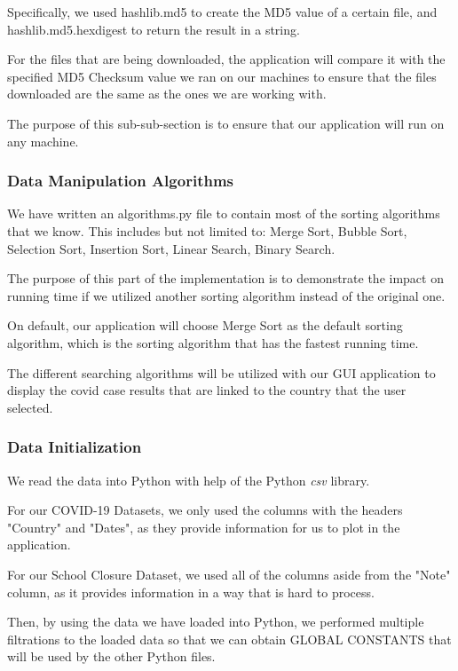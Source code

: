 \documentclass[fontsize=11pt]{article}
\begin{document}
    Specifically, we used hashlib.md5 to create the MD5 value of a certain file, and hashlib.md5.hexdigest to return the result in a string.

    For the files that are being downloaded, the application will compare it with the specified MD5 Checksum value we ran on our machines to ensure that the files downloaded are the same as the ones we are working with.

    The purpose of this sub-sub-section is to ensure that our application will run on any machine.

    \subsubsection{Data Manipulation Algorithms}

    We have written an algorithms.py file to contain most of the sorting algorithms that we know. This includes but not limited to: Merge Sort, Bubble Sort, Selection Sort, Insertion Sort, Linear Search, Binary Search.

    The purpose of this part of the implementation is to demonstrate the impact on running time if we utilized another sorting algorithm instead of the original one.

    On default, our application will choose Merge Sort as the default sorting algorithm, which is the sorting algorithm that has the fastest running time.

    The different searching algorithms will be utilized with our GUI application to display the covid case results that are linked to the country that the user selected.

    \subsubsection{Data Initialization}

    We read the data into Python with help of the Python \emph{csv} library.

    For our COVID-19 Datasets, we only used the columns with the headers "Country" and "Dates", as they provide information for us to plot in the application.

    For our School Closure Dataset, we used all of the columns aside from the "Note" column, as it provides information in a way that is hard to process.

    Then, by using the data we have loaded into Python, we performed multiple filtrations to the loaded data so that we can obtain GLOBAL CONSTANTS that will be used by the other Python files.
\end{document}
